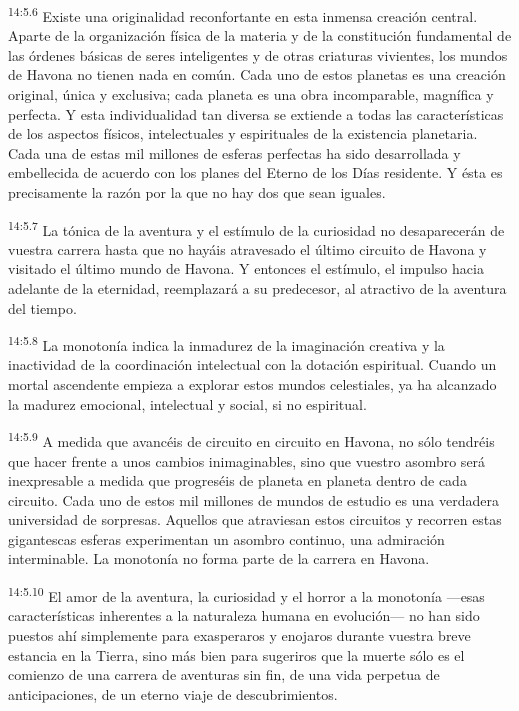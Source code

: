 \par
\textsuperscript{14:5.6} Existe una originalidad reconfortante en esta inmensa creación central. Aparte de la organización física de la materia y de la constitución fundamental de las órdenes básicas de seres inteligentes y de otras criaturas vivientes, los mundos de Havona no tienen nada en común. Cada uno de estos planetas es una creación original, única y exclusiva; cada planeta es una obra incomparable, magnífica y perfecta. Y esta individualidad tan diversa se extiende a todas las características de los aspectos físicos, intelectuales y espirituales de la existencia planetaria. Cada una de estas mil millones de esferas perfectas ha sido desarrollada y embellecida de acuerdo con los planes del Eterno de los Días residente. Y ésta es precisamente la razón por la que no hay dos que sean iguales.

\par
\textsuperscript{14:5.7} La tónica de la aventura y el estímulo de la curiosidad no desaparecerán de vuestra carrera hasta que no hayáis atravesado el último circuito de Havona y visitado el último mundo de Havona. Y entonces el estímulo, el impulso hacia adelante de la eternidad, reemplazará a su predecesor, al atractivo de la aventura del tiempo.

\par
\textsuperscript{14:5.8} La monotonía indica la inmadurez de la imaginación creativa y la inactividad de la coordinación intelectual con la dotación espiritual. Cuando un mortal ascendente empieza a explorar estos mundos celestiales, ya ha alcanzado la madurez emocional, intelectual y social, si no espiritual.

\par
\textsuperscript{14:5.9} A medida que avancéis de circuito en circuito en Havona, no sólo tendréis que hacer frente a unos cambios inimaginables, sino que vuestro asombro será inexpresable a medida que progreséis de planeta en planeta dentro de cada circuito. Cada uno de estos mil millones de mundos de estudio es una verdadera universidad de sorpresas. Aquellos que atraviesan estos circuitos y recorren estas gigantescas esferas experimentan un asombro continuo, una admiración interminable. La monotonía no forma parte de la carrera en Havona.

\par
\textsuperscript{14:5.10} El amor de la aventura, la curiosidad y el horror a la monotonía ---esas características inherentes a la naturaleza humana en evolución--- no han sido puestos ahí simplemente para exasperaros y enojaros durante vuestra breve estancia en la Tierra, sino más bien para sugeriros que la muerte sólo es el comienzo de una carrera de aventuras sin fin, de una vida perpetua de anticipaciones, de un eterno viaje de descubrimientos.

